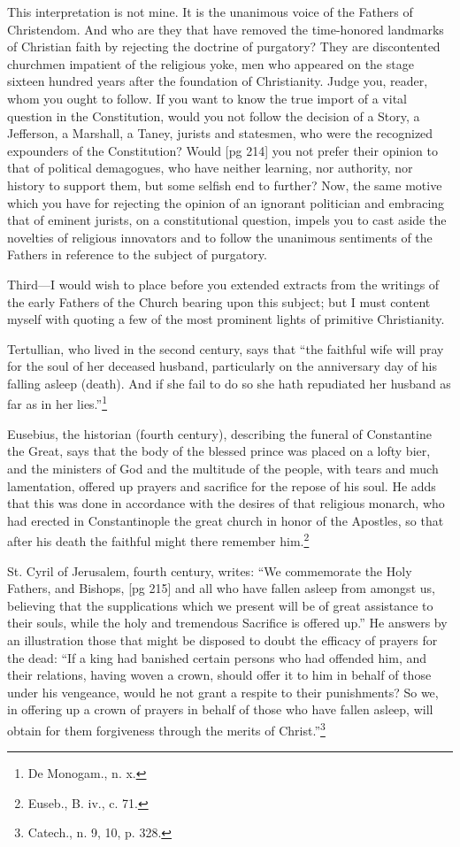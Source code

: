 This interpretation is not mine. It is the unanimous
voice of the Fathers of Christendom. And
who are they that have removed the time-honored
landmarks of Christian faith by rejecting the
doctrine of purgatory? They are discontented
churchmen impatient of the religious yoke, men
who appeared on the stage sixteen hundred years
after the foundation of Christianity. Judge you,
reader, whom you ought to follow. If you want
to know the true import of a vital question in
the Constitution, would you not follow the decision
of a Story, a Jefferson, a Marshall, a
Taney, jurists and statesmen, who were the recognized
expounders of the Constitution? Would
[pg 214]
you not prefer their opinion to that of political
demagogues, who have neither learning, nor authority,
nor history to support them, but some
selfish end to further? Now, the same motive
which you have for rejecting the opinion of an
ignorant politician and embracing that of eminent
jurists, on a constitutional question, impels you
to cast aside the novelties of religious innovators
and to follow the unanimous sentiments of the
Fathers in reference to the subject of purgatory.

Third—I would wish to place before you extended
extracts from the writings of the early
Fathers of the Church bearing upon this subject;
but I must content myself with quoting a few of
the most prominent lights of primitive Christianity.

Tertullian, who lived in the second century, says
that “the faithful wife will pray for the soul of
her deceased husband, particularly on the anniversary
day of his falling asleep (death). And
if she fail to do so she hath repudiated her husband
as far as in her lies.”\footnote{De Monogam., n. x.}

Eusebius, the historian (fourth century), describing
the funeral of Constantine the Great,
says that the body of the blessed prince was
placed on a lofty bier, and the ministers of God
and the multitude of the people, with tears and
much lamentation, offered up prayers and sacrifice
for the repose of his soul. He adds that this
was done in accordance with the desires of that
religious monarch, who had erected in Constantinople
the great church in honor of the Apostles,
so that after his death the faithful might there
remember him.\footnote{Euseb., B. iv., c. 71.}

St. Cyril of Jerusalem, fourth century, writes:
“We commemorate the Holy Fathers, and Bishops,
[pg 215]
and all who have fallen asleep from amongst
us, believing that the supplications which we present
will be of great assistance to their souls, while
the holy and tremendous Sacrifice is offered up.”
He answers by an illustration those that might
be disposed to doubt the efficacy of prayers for
the dead: “If a king had banished certain persons
who had offended him, and their relations,
having woven a crown, should offer it to him
in behalf of those under his vengeance, would he
not grant a respite to their punishments? So
we, in offering up a crown of prayers in behalf
of those who have fallen asleep, will obtain for
them forgiveness through the merits of Christ.”\footnote{Catech.,
n. 9, 10, p. 328.}

